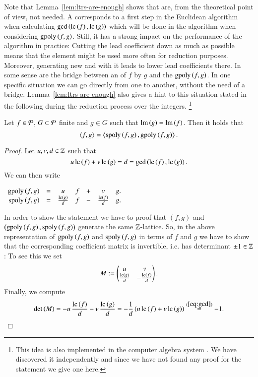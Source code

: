Note that Lemma~\ref{lem:ltrs-are-enough} shows that \lcrs are, from the
theoretical point of view, not needed. A \lcr corresponds
to a first step in the Euclidean algorithm when calculating $\gcd\left(\mathrm{lc}\left({f}\right), \mathrm{lc}\left({g}\right)\right)$ which will be done in the algorithm when considering $\mathrm{gpoly}\left({f},{g}\right)$.
Still, it has a strong impact on the performance of the algorithm in practice:
Cutting the lead coefficient down as much as possible means that the element
might be used more often for reduction purposes. Moreover, generating new \spts
and \gpts with it leads to lower lead coefficients there. In some sense \lcrs are
the bridge between an \ltr of $f$ by $g$ and the $\mathrm{gpoly}\left({f},{g}\right)$. In one specific
situation we can go directly from one to another, without the need of a bridge. 
Lemma~\ref{lem:ltrs-are-enough} also gives a hint to this situation stated in
the following
during the reduction process over the integers.
\footnote{This idea is also implemented in the computer algebra system
\macaulay. We have discovered it independently and since we have not
found any proof for the statement we give one here.}
\begin{lemma}
Let $f \in \mathcal{P}$, $G \subset \mathcal{P}$ finite and $g\in G$ such that
$\operatorname{lm}\left({g}\right) = \operatorname{lm}\left({f}\right)$. Then it holds that
\[\left\langle f,g\right\rangle
  = \left\langle \mathrm{spoly}\left({f},{g}\right), \mathrm{gpoly}\left({f},{g}\right)\right\rangle.\]
  \label{lem:m2-replace-trick}
\end{lemma}

\begin{proof}
Let $u,v, d \in \mathbb{Z}$ such that
\begin{equation}
u\, \mathrm{lc}\left({f}\right) + v\, \mathrm{lc}\left({g}\right) = d = \gcd\left(\mathrm{lc}\left({f}\right), \mathrm{lc}\left({g}\right)\right).
\label{eq:gcd}
\end{equation}
We can then write
\begin{center}
$
\begin{array}[]{rcccccc}
\gpoly fg &= & u& f& + &v& g.\\
\spoly fg &=& \frac{\lc g}{d}& f& - &\frac{\lc f}{d}&g.
\end{array}
$
\end{center}
In order to show the statement we have to proof that $(f,g)$ and $\left(\mathrm{gpoly}\left({f},{g}\right),
\mathrm{spoly}\left({f},{g}\right)\right)$ generate the same $\mathbb{Z}$-lattice. So, in the above
representation of $\mathrm{gpoly}\left({f},{g}\right)$ and $\mathrm{spoly}\left({f},{g}\right)$ in terms of $f$ and $g$ we have to
show that the corresponding coefficient matrix is invertible, i.e. has
determinant $\pm 1 \in \mathbb{Z}$:
To see this we set
\[M := \begin{pmatrix} u & v\\ \frac{\mathrm{lc}\left({g}\right)}{d} & -\frac{\mathrm{lc}\left({f}\right)}{d}\end{pmatrix}.\]
Finally, we compute
\[\det\left(M\right) = - u\, \frac{\mathrm{lc}\left({f}\right)}{d}
- v\, \frac{\mathrm{lc}\left({g}\right)}{d} = -\frac 1d \left(u\, \mathrm{lc}\left({f}\right) + v\, \mathrm{lc}\left({g}\right)\right)
  \stackrel{(\ref{eq:gcd})}{=} -1.\]
\end{proof}

